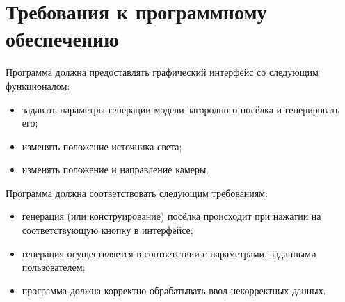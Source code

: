 \section{Требования к программному обеспечению}

Программа должна предоставлять графический интерфейс со следующим функционалом:
\begin{itemize}
    \item задавать параметры генерации модели загородного посёлка и генерировать его;
    \item изменять положение источника света;
    \item изменять положение и направление камеры.
\end{itemize}

Программа должна соответствовать следующим требованиям:
\begin{itemize}
    \item генерация (или конструирование) посёлка происходит при нажатии на соответствующую кнопку в интерфейсе;
    \item генерация осуществляется в соответствии с параметрами, заданными пользователем;
    \item программа должна корректно обрабатывать ввод некорректных данных.
\end{itemize}
